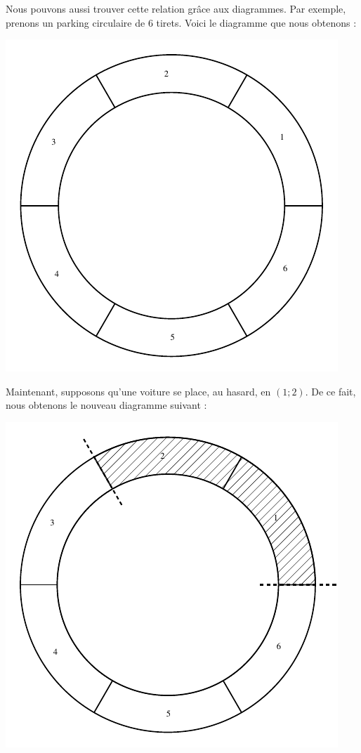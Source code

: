 \documentclass[a4paper,francais,11pt]{article}
\begin{document}
Nous pouvons aussi trouver cette relation grâce aux diagrammes. Par exemple, prenons un parking circulaire de $6$ tirets. Voici le diagramme que nous obtenons :
\begin{center}
\includegraphics{fig4.pdf}
\end{center}

Maintenant, supposons qu'une voiture se place, au hasard, en $(1;2)$. De ce fait, nous obtenons le nouveau diagramme suivant :
\begin{center}
\includegraphics{fig5.pdf}
\end{center}
\end{document}
